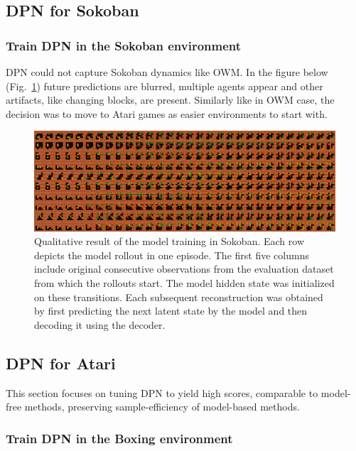 \subsection{DPN for Sokoban}

\subsubsection{Train DPN in the Sokoban environment}

DPN could not capture Sokoban dynamics like OWM. In the figure below (Fig.~\ref{Fig.PlaNet_Sokoban_openloop}) future predictions are blurred, multiple agents appear and other artifacts, like changing blocks, are present. Similarly like in OWM case, the decision was to move to Atari games as easier environments to start with.

\begin{figure}[H]
\includegraphics[width=1\textwidth,keepaspectratio]{figures/PlaNet/Sokoban_memory.png}
\caption[Qualitative result of the PlaNet model training in Sokoban]{Qualitative result of the model training in Sokoban. Each row depicts the model rollout in one episode. The first five columns include original consecutive observations from the evaluation dataset from which the rollouts start. The model hidden state was initialized on these transitions. Each subsequent reconstruction was obtained by first predicting the next latent state by the model and then decoding it using the decoder.}
\label{Fig.PlaNet_Sokoban_openloop}
\end{figure}

\subsection{DPN for Atari}

This section focuses on tuning DPN to yield high scores, comparable to model-free methods, preserving sample-efficiency of model-based methods.

\subsubsection{Train DPN in the Boxing environment}

